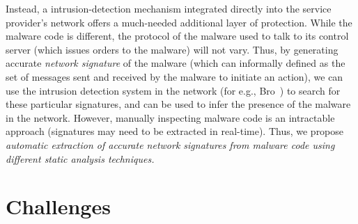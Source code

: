 \documentclass[]{article}
\begin{document}
Instead, a intrusion-detection mechanism integrated 
directly into the service provider’s network offers a
much-needed additional layer of protection. While the malware
code is different, the protocol of the malware used to talk to its
control server (which issues orders to the malware) will not vary. 
Thus, by generating accurate \emph{network signature} of the malware (which
can informally defined as the set of messages sent and received by the malware to
initiate an action), we can use the intrusion detection system in the
network (for e.g., Bro~\cite{bro}) to search for these particular signatures,
and can be used to infer the presence of the malware in the network. However,
manually inspecting malware code is an intractable approach (signatures may 
need to be extracted in real-time). Thus, we propose \emph{automatic extraction 
of accurate network signatures from malware code using different static
analysis techniques.} 

\section{Challenges}





\end{document}
